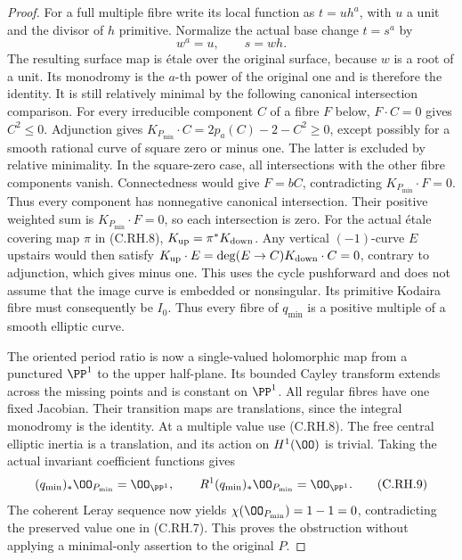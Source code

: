 \begin{proof}
For a full multiple fibre
write its local function as
\(t=u h^a\), with \(u\) a
unit and the divisor of
\(h\) primitive. Normalize
the actual base change
\(t=s^a\) by
\[
                         w^a=u,\qquad s=wh .
 \tag{C.RH.8}
\]
The resulting surface map
is \'{e}tale over the
original surface, because
\(w\) is a root of a unit.
Its monodromy is the
\(a\)-th power of the
original one and is
therefore the identity.
It is still relatively
minimal by the following
canonical intersection
comparison. For every
irreducible component \(C\)
of a fibre \(F\) below,
\(F\cdot C=0\) gives
\(C^2\le0\). Adjunction
gives
\(K_{P_{\min}}\cdot C
=2p_a(C)-2-C^2\ge0\),
except possibly for a
smooth rational curve of
square zero or minus one.
The latter is excluded
by relative minimality.
In the square-zero case,
all intersections with
the other fibre components
vanish. Connectedness
would give \(F=bC\),
contradicting
\(K_{P_{\min}}\cdot F=0\).
Thus every component has
nonnegative canonical
intersection. Their
positive weighted sum
is \(K_{P_{\min}}\cdot F=0\),
so each intersection
is zero. For the actual
\'{e}tale covering map
\(\pi\) in (C.RH.8),
\(K_{\rm up}=\pi^*K_{\rm down}\).
Any vertical \((-1)\)-curve
\(E\) upstairs would then
satisfy
\(K_{\rm up}\cdot E
=\deg(E\to C)K_{\rm down}\cdot C=0\),
contrary to adjunction,
which gives minus one.
This uses the cycle
pushforward and does
not assume that the
image curve is embedded
or nonsingular.
Its primitive Kodaira
fibre must consequently
be \(I_0\). Thus every
fibre of \(q_{\min}\)
is a positive multiple
of a smooth elliptic
curve.

The oriented period ratio
is now a single-valued
holomorphic map from a
punctured \(\PP^1\) to
the upper half-plane.
Its bounded Cayley
transform extends across
the missing points and
is constant on \(\PP^1\).
All regular fibres have
one fixed Jacobian.
Their transition maps
are translations, since
the integral monodromy
is the identity. At a
multiple value use
(C.RH.8). The free
central elliptic inertia
is a translation, and
its action on \(H^1(\OO)\)
is trivial. Taking the
actual invariant coefficient
functions gives
\[
 (q_{\min})_*\OO_{P_{\min}}=\OO_{\PP^1},
 \qquad R^1(q_{\min})_*\OO_{P_{\min}}=\OO_{\PP^1}.
 \tag{C.RH.9}
\]
The coherent Leray
sequence now yields
\(\chi(\OO_{P_{\min}})=1-1=0\),
contradicting the preserved
value one in (C.RH.7).
This proves the obstruction
without applying a
minimal-only assertion
to the original \(P\).


\end{proof}
